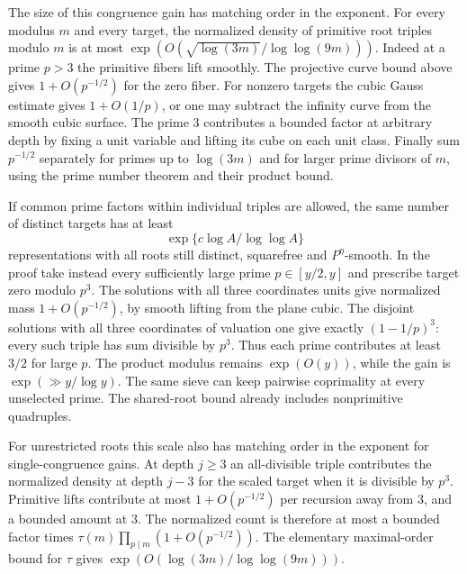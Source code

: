 \documentclass[11pt,letterpaper]{article}
\theoremstyle{definition}
\begin{document}
The size of this congruence gain has matching order in the
exponent. For every modulus $m$ and every target, the normalized
density of primitive root triples modulo $m$ is at most
$\exp(O(\sqrt{\log(3m)}/\log\log(9m)))$.
Indeed at a prime $p>3$ the primitive fibers lift smoothly.
The projective curve bound above gives $1+O(p^{-1/2})$ for the
zero fiber. For nonzero targets the cubic Gauss estimate gives
$1+O(1/p)$, or one may subtract the infinity curve from the
smooth cubic surface. The prime $3$ contributes a bounded factor
at arbitrary depth by fixing a unit variable and lifting its cube
on each unit class. Finally sum $p^{-1/2}$ separately for primes
up to $\log(3m)$ and for larger prime divisors of $m$, using the
prime number theorem and their product bound.

If common prime factors within individual triples are allowed, the
same number of distinct targets has at least
\begin{equation}\label{c3:imprimitive-many}
                    \exp\{c\log A/\log\log A\}
\end{equation}
representations with all roots still distinct, squarefree and
$P^\eta$-smooth. In the proof take instead every sufficiently large
prime $p\in[y/2,y]$ and prescribe target zero modulo $p^3$.
The solutions with all three coordinates units give normalized
mass $1+O(p^{-1/2})$, by smooth lifting from the plane cubic.
The disjoint solutions with all three coordinates of valuation
one give exactly $(1-1/p)^3$: every such triple has sum
divisible by $p^3$. Thus each prime contributes at least $3/2$
for large $p$. The product modulus remains $\exp(O(y))$, while
the gain is $\exp(\gg y/\log y)$. The same sieve can keep
pairwise coprimality at every unselected prime. The shared-root
bound already includes nonprimitive quadruples.

For unrestricted roots this scale also has matching order in the
exponent for single-congruence gains. At depth $j\ge3$ an all-divisible
triple contributes the normalized density at depth $j-3$ for the
scaled target when it is divisible by $p^3$. Primitive lifts
contribute at most $1+O(p^{-1/2})$ per recursion away from $3$,
and a bounded amount at $3$. The normalized count is therefore at
most a bounded factor times
$\tau(m)\prod_{p\mid m}(1+O(p^{-1/2}))$.
The elementary maximal-order bound for $\tau$ gives
$\exp(O(\log(3m)/\log\log(9m)))$.
\end{document}

